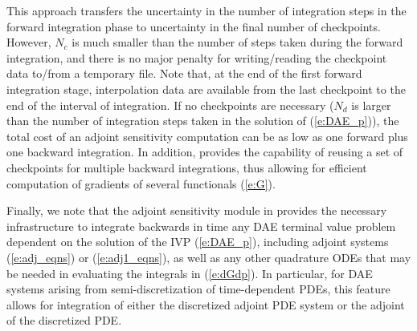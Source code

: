 This approach transfers the uncertainty in the number of integration
steps in the forward integration phase to uncertainty in the final
number of checkpoints.  However, $N_c$ is much smaller than the number
of steps taken during the forward integration, and there is no major
penalty for writing/reading the checkpoint data to/from a temporary
file.
%
Note that, at the end of the first forward integration stage, interpolation
data are available from the last checkpoint to the end of the interval
of integration.  If no checkpoints are necessary ($N_d$ is larger than the 
number of integration steps taken in the solution of (\ref{e:DAE_p})),
the total cost of an adjoint sensitivity computation can be as low as one forward
plus one backward integration.
%
In addition, {\idas} provides the capability of reusing a set of checkpoints
for multiple backward integrations, thus allowing for efficient computation of
gradients of several functionals (\ref{e:G}).

\bigskip

Finally, we note that the adjoint sensitivity module in {\idas} provides the
necessary infrastructure to integrate backwards in time any DAE terminal value
problem dependent on the solution of the IVP (\ref{e:DAE_p}), including
adjoint systems (\ref{e:adj_eqns}) or (\ref{e:adj1_eqns}), as well as any other
quadrature ODEs that may be needed in evaluating the integrals in (\ref{e:dGdp}).
In particular, for DAE systems arising from semi-discretization
of time-dependent PDEs, this feature allows for integration of either the 
discretized adjoint PDE system or the adjoint of the discretized PDE.

